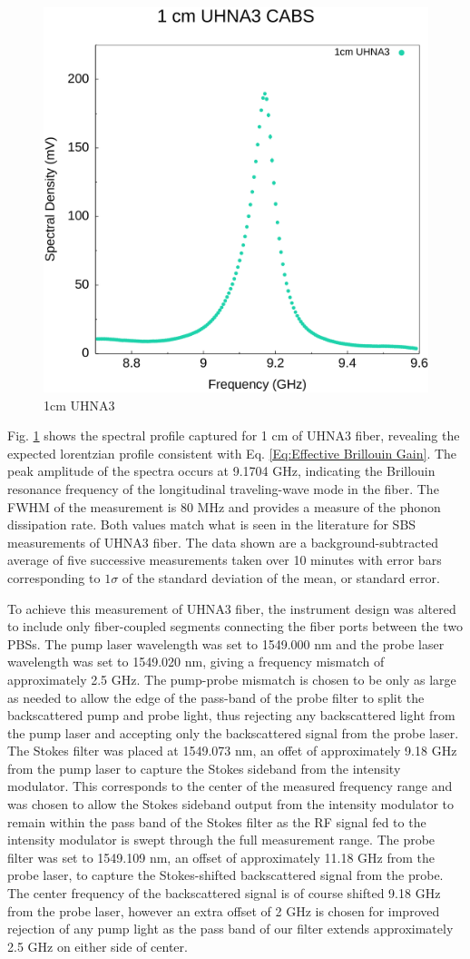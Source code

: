 \documentclass[%
  reprint,
  superscriptaddress,
  amsmath,amssymb,
  aps,
  prapplied,
]{revtex4-2}
\begin{document}
\begin{figure}[t]
  \centering
  \includegraphics[width=.45\textwidth]{1cmUHNA3.pdf}
  \caption{1cm UHNA3}
  \label{fig:1cmUHNA3}
\end{figure}

Fig. \ref{fig:1cmUHNA3} shows the spectral profile captured for 1 cm of UHNA3 fiber, revealing the expected lorentzian profile consistent with Eq. \ref{Eq:Effective Brillouin Gain}. The peak amplitude of the spectra occurs at 9.1704 GHz, indicating the Brillouin resonance frequency of the longitudinal traveling-wave mode in the fiber. The FWHM of the measurement is 80 MHz and provides a measure of the phonon dissipation rate. Both values match what is seen in the literature for SBS measurements of UHNA3 fiber.\cite{behunin2015long} The data shown are a background-subtracted average of five successive measurements taken over 10 minutes with error bars corresponding to $1\sigma$ of the standard deviation of the mean, or standard error.

To achieve this measurement of UHNA3 fiber, the instrument design was altered to include only fiber-coupled segments connecting the fiber ports between the two PBSs. The pump laser wavelength was set to 1549.000 nm and the probe laser wavelength was set to 1549.020 nm, giving a frequency mismatch of approximately 2.5 GHz. The pump-probe mismatch is chosen to be only as large as needed to allow the edge of the pass-band of the probe filter to split the backscattered pump and probe light, thus rejecting any backscattered light from the pump laser and accepting only the backscattered signal from the probe laser. The Stokes filter was placed at 1549.073 nm, an offet of approximately 9.18 GHz from the pump laser to capture the Stokes sideband from the intensity modulator. This corresponds to the center of the measured frequency range and was chosen to allow the Stokes sideband output from the intensity modulator to remain within the pass band of the Stokes filter as the RF signal fed to the intensity modulator is swept through the full measurement range. The probe filter was set to 1549.109 nm, an offset of approximately 11.18 GHz from the probe laser, to capture the Stokes-shifted backscattered signal from the probe. The center frequency of the backscattered signal is of course shifted 9.18 GHz from the probe laser, however an extra offset of 2 GHz is chosen for improved rejection of any pump light as the pass band of our filter extends approximately 2.5 GHz on either side of center.
\end{document}
